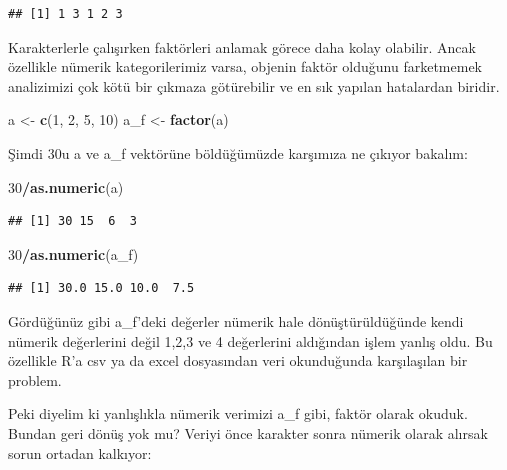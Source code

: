 \documentclass[
]{book}
\newenvironment{Shaded}{\begin{snugshade}}{\end{snugshade}}
\newcommand{\DecValTok}[1]{\textcolor[rgb]{0.00,0.00,0.81}{#1}}
\newcommand{\KeywordTok}[1]{\textcolor[rgb]{0.13,0.29,0.53}{\textbf{#1}}}
\newcommand{\NormalTok}[1]{#1}
\newcommand{\OperatorTok}[1]{\textcolor[rgb]{0.81,0.36,0.00}{\textbf{#1}}}
\newcommand{\StringTok}[1]{\textcolor[rgb]{0.31,0.60,0.02}{#1}}
\begin{document}
\begin{verbatim}
## [1] 1 3 1 2 3
\end{verbatim}

Karakterlerle çalışırken faktörleri anlamak görece daha kolay olabilir. Ancak özellikle nümerik kategorilerimiz varsa, objenin faktör olduğunu farketmemek analizimizi çok kötü bir çıkmaza götürebilir ve en sık yapılan hatalardan biridir.

\begin{Shaded}
\begin{Highlighting}[]
\NormalTok{a <{-}}\StringTok{ }\KeywordTok{c}\NormalTok{(}\DecValTok{1}\NormalTok{, }\DecValTok{2}\NormalTok{, }\DecValTok{5}\NormalTok{, }\DecValTok{10}\NormalTok{)}
\NormalTok{a\_f <{-}}\StringTok{ }\KeywordTok{factor}\NormalTok{(a)}
\end{Highlighting}
\end{Shaded}

Şimdi 30u a ve a\_f vektörüne böldüğümüzde karşımıza ne çıkıyor bakalım:

\begin{Shaded}
\begin{Highlighting}[]
\DecValTok{30}\OperatorTok{/}\KeywordTok{as.numeric}\NormalTok{(a)}
\end{Highlighting}
\end{Shaded}

\begin{verbatim}
## [1] 30 15  6  3
\end{verbatim}

\begin{Shaded}
\begin{Highlighting}[]
\DecValTok{30}\OperatorTok{/}\KeywordTok{as.numeric}\NormalTok{(a\_f)}
\end{Highlighting}
\end{Shaded}

\begin{verbatim}
## [1] 30.0 15.0 10.0  7.5
\end{verbatim}

Gördüğünüz gibi a\_f'deki değerler nümerik hale dönüştürüldüğünde kendi nümerik değerlerini değil 1,2,3 ve 4 değerlerini aldığından işlem yanlış oldu. Bu özellikle R'a csv ya da excel dosyasından veri okunduğunda karşılaşılan bir problem.

Peki diyelim ki yanlışlıkla nümerik verimizi a\_f gibi, faktör olarak okuduk. Bundan geri dönüş yok mu? Veriyi önce karakter sonra nümerik olarak alırsak sorun ortadan kalkıyor:
\end{document}
